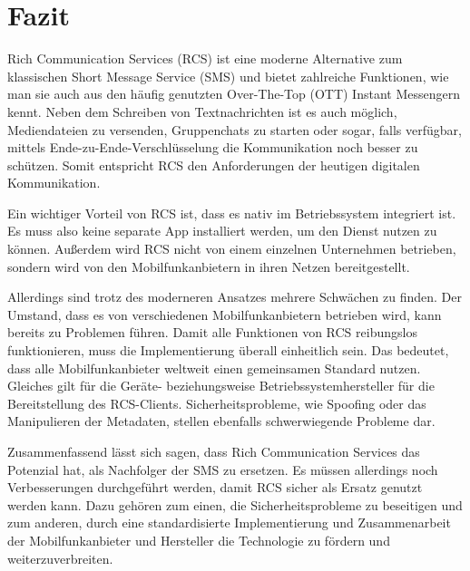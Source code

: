 \documentclass[conference]{IEEEtran}
\begin{document}
\section{Fazit}

Rich Communication Services (RCS) ist eine moderne Alternative zum klassischen Short Message Service (SMS) und bietet zahlreiche Funktionen, wie man sie auch aus den häufig genutzten Over-The-Top (OTT) Instant Messengern kennt.
Neben dem Schreiben von Textnachrichten ist es auch möglich, Mediendateien zu versenden, Gruppenchats zu starten oder sogar, falls verfügbar, mittels Ende-zu-Ende-Verschlüsselung die Kommunikation noch besser zu schützen.
Somit entspricht RCS den Anforderungen der heutigen digitalen Kommunikation.

Ein wichtiger Vorteil von RCS ist, dass es nativ im Betriebssystem integriert ist.
Es muss also keine separate App installiert werden, um den Dienst nutzen zu können.
Außerdem wird RCS nicht von einem einzelnen Unternehmen betrieben, sondern wird von den Mobilfunkanbietern in ihren Netzen bereitgestellt.

Allerdings sind trotz des moderneren Ansatzes mehrere Schwächen zu finden.
Der Umstand, dass es von verschiedenen Mobilfunkanbietern betrieben wird, kann bereits zu Problemen führen.
Damit alle Funktionen von RCS reibungslos funktionieren, muss die Implementierung überall einheitlich sein.
Das bedeutet, dass alle Mobilfunkanbieter weltweit einen gemeinsamen Standard nutzen.
Gleiches gilt für die Geräte- beziehungsweise Betriebssystemhersteller für die Bereitstellung des RCS-Clients.
Sicherheitsprobleme, wie Spoofing oder das Manipulieren der Metadaten, stellen ebenfalls schwerwiegende Probleme dar.

Zusammenfassend lässt sich sagen, dass Rich Communication Services das Potenzial hat, als Nachfolger der SMS zu ersetzen.
Es müssen allerdings noch Verbesserungen durchgeführt werden, damit RCS sicher als Ersatz genutzt werden kann.
Dazu gehören zum einen, die Sicherheitsprobleme zu beseitigen und zum anderen, durch eine standardisierte Implementierung und Zusammenarbeit der Mobilfunkanbieter und Hersteller die Technologie zu fördern und weiterzuverbreiten.



\end{document}
